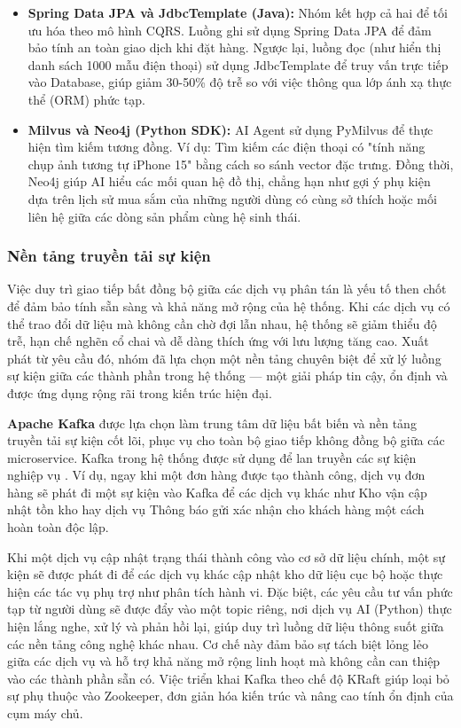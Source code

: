 \begin{itemize}
    \item \textbf{Spring Data JPA và JdbcTemplate (Java):} Nhóm kết hợp cả hai để tối ưu hóa theo mô hình CQRS. Luồng ghi sử dụng Spring Data JPA để đảm bảo tính an toàn giao dịch khi đặt hàng. Ngược lại, luồng đọc (như hiển thị danh sách 1000 mẫu điện thoại) sử dụng JdbcTemplate để truy vấn trực tiếp vào Database, giúp giảm 30-50\% độ trễ so với việc thông qua lớp ánh xạ thực thể (ORM) phức tạp.
    \item \textbf{Milvus và Neo4j (Python SDK):} AI Agent sử dụng PyMilvus để thực hiện tìm kiếm tương đồng. Ví dụ: Tìm kiếm các điện thoại có "tính năng chụp ảnh tương tự iPhone 15" bằng cách so sánh vector đặc trưng. Đồng thời, Neo4j giúp AI hiểu các mối quan hệ đồ thị, chẳng hạn như gợi ý phụ kiện dựa trên lịch sử mua sắm của những người dùng có cùng sở thích hoặc mối liên hệ giữa các dòng sản phẩm cùng hệ sinh thái.
\end{itemize}

\subsubsection{Nền tảng truyền tải sự kiện}

Việc duy trì giao tiếp bất đồng bộ giữa các dịch vụ phân tán là yếu tố then chốt để đảm bảo tính sẵn sàng và khả năng mở rộng của hệ thống. Khi các dịch vụ có thể trao đổi dữ liệu mà không cần chờ đợi lẫn nhau, hệ thống sẽ giảm thiểu độ trễ, hạn chế nghẽn cổ chai và dễ dàng thích ứng với lưu lượng tăng cao. Xuất phát từ yêu cầu đó, nhóm đã lựa chọn một nền tảng chuyên biệt để xử lý luồng sự kiện giữa các thành phần trong hệ thống — một giải pháp tin cậy, ổn định và được ứng dụng rộng rãi trong kiến trúc hiện đại.

\textbf{Apache Kafka} được lựa chọn làm trung tâm dữ liệu bất biến và nền tảng truyền tải sự kiện cốt lõi, phục vụ cho toàn bộ giao tiếp không đồng bộ giữa các microservice. Kafka trong hệ thống được sử dụng để lan truyền các sự kiện nghiệp vụ . Ví dụ, ngay khi một đơn hàng được tạo thành công, dịch vụ đơn hàng sẽ phát đi một sự kiện vào Kafka để các dịch vụ khác như Kho vận cập nhật tồn kho hay dịch vụ Thông báo gửi xác nhận cho khách hàng một cách hoàn toàn độc lập.

Khi một dịch vụ cập nhật trạng thái thành công vào cơ sở dữ liệu chính, một sự kiện sẽ được phát đi để các dịch vụ khác cập nhật kho dữ liệu cục bộ hoặc thực hiện các tác vụ phụ trợ như phân tích hành vi. Đặc biệt, các yêu cầu tư vấn phức tạp từ người dùng sẽ được đẩy vào một topic riêng, nơi dịch vụ AI (Python) thực hiện lắng nghe, xử lý và phản hồi lại, giúp duy trì luồng dữ liệu thông suốt giữa các nền tảng công nghệ khác nhau. Cơ chế này đảm bảo sự tách biệt lỏng lẻo giữa các dịch vụ và hỗ trợ khả năng mở rộng linh hoạt mà không cần can thiệp vào các thành phần sẵn có. Việc triển khai Kafka theo chế độ KRaft giúp loại bỏ sự phụ thuộc vào Zookeeper, đơn giản hóa kiến trúc và nâng cao tính ổn định của cụm máy chủ.

